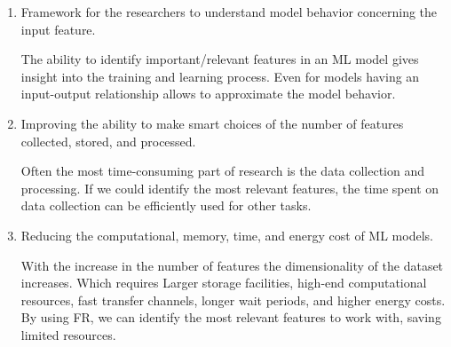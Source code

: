 \documentclass[11pt]{article}
\begin{document}
\begin{enumerate}
    \item Framework for the researchers to understand model behavior concerning the input feature.
    
    The ability to identify important/relevant features in an ML model gives insight into the training and learning process. Even for  models having an input-output relationship allows to approximate the model behavior.
    
    \item Improving the ability to make smart choices of the number of features collected, stored, and processed.
    
    Often the most time-consuming part of research is the data collection and processing. If we could identify the most relevant features, the time spent on data collection can be efficiently used for other tasks.
    
    \item Reducing the computational, memory, time, and energy cost of ML models.
    
    With the increase in the number of features the dimensionality of the dataset increases. Which requires Larger storage facilities, high-end computational resources, fast transfer channels, longer wait periods, and higher energy costs. By using FR, we can identify the most relevant features to work with, saving limited resources.
\end{enumerate}
\end{document}
